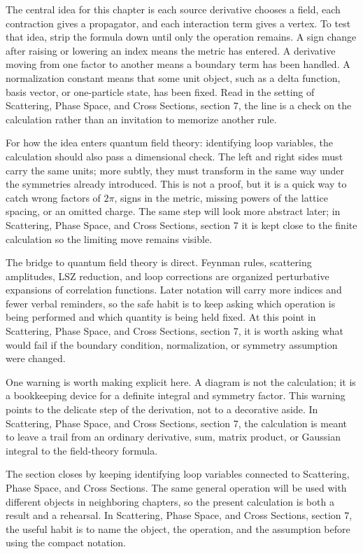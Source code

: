 The central idea for this chapter is each source derivative chooses a field, each contraction gives a propagator, and each interaction term gives a vertex.  To test that idea, strip the formula down until only the operation remains.  A sign change after raising or lowering an index means the metric has entered.  A derivative moving from one factor to another means a boundary term has been handled.  A normalization constant means that some unit object, such as a delta function, basis vector, or one-particle state, has been fixed.  Read in the setting of Scattering, Phase Space, and Cross Sections, section 7, the line is a check on the calculation rather than an invitation to memorize another rule.

For how the idea enters quantum field theory: identifying loop variables, the calculation should also pass a dimensional check.  The left and right sides must carry the same units; more subtly, they must transform in the same way under the symmetries already introduced.  This is not a proof, but it is a quick way to catch wrong factors of \(2\pi\), signs in the metric, missing powers of the lattice spacing, or an omitted charge.  The same step will look more abstract later; in Scattering, Phase Space, and Cross Sections, section 7 it is kept close to the finite calculation so the limiting move remains visible.

The bridge to quantum field theory is direct.  Feynman rules, scattering amplitudes, LSZ reduction, and loop corrections are organized perturbative expansions of correlation functions.  Later notation will carry more indices and fewer verbal reminders, so the safe habit is to keep asking which operation is being performed and which quantity is being held fixed.  At this point in Scattering, Phase Space, and Cross Sections, section 7, it is worth asking what would fail if the boundary condition, normalization, or symmetry assumption were changed.

One warning is worth making explicit here.  A diagram is not the calculation; it is a bookkeeping device for a definite integral and symmetry factor.  This warning points to the delicate step of the derivation, not to a decorative aside.  In Scattering, Phase Space, and Cross Sections, section 7, the calculation is meant to leave a trail from an ordinary derivative, sum, matrix product, or Gaussian integral to the field-theory formula.

The section closes by keeping identifying loop variables connected to Scattering, Phase Space, and Cross Sections.  The same general operation will be used with different objects in neighboring chapters, so the present calculation is both a result and a rehearsal.  In Scattering, Phase Space, and Cross Sections, section 7, the useful habit is to name the object, the operation, and the assumption before using the compact notation.




